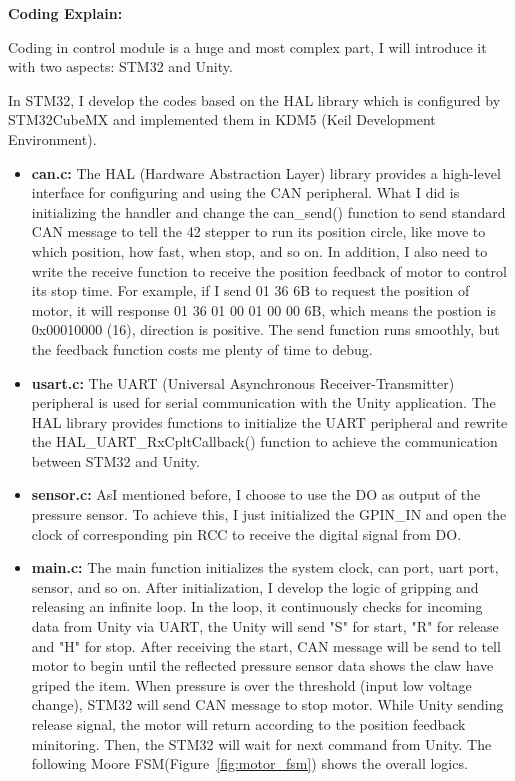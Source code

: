 \textbf{Coding Explain:}
  
Coding in control module is a huge and most complex part, I will introduce it with two aspects: STM32 and Unity.
  
In STM32, I develop the codes based on the HAL library which is configured by STM32CubeMX and implemented them in KDM5 (Keil Development Environment).
\begin{itemize}
    \item \textbf{can.c:} 
    The HAL (Hardware Abstraction Layer) library provides a high-level interface for configuring and using the CAN peripheral. What I did is initializing the handler and change the can\_send() function to send standard CAN message to tell the 42 stepper to run its position circle, like move to which position, how fast, when stop, and so on. In addition, I also need to write the receive function to receive the position feedback of motor to control its stop time. For example, if I send 01 36 6B to request the position of motor, it will response 01 36 01 00 01 00 00 6B, which means the postion is 0x00010000 (16), direction is positive. The send function runs smoothly, but the feedback function costs me plenty of time to debug.
    \item \textbf{usart.c:}
    The UART (Universal Asynchronous Receiver-Transmitter) peripheral is used for serial communication with the Unity application. The HAL library provides functions to initialize the UART peripheral and rewrite the HAL\_UART\_RxCpltCallback() function to achieve the communication between STM32 and Unity.
    \item \textbf{sensor.c:} 
    AsI mentioned before, I choose to use the DO as output of the pressure sensor. To achieve this, I just initialized the GPIN\_IN and open the clock of corresponding pin RCC to receive the digital signal from DO.
    \item \textbf{main.c:}
    The main function initializes the system clock, can port, uart port, sensor, and so on. After initialization, I develop the logic of gripping and releasing an infinite loop. In the loop, it continuously checks for incoming data from Unity via UART, the Unity will send "S" for start, "R" for release and "H" for stop. After receiving the start, CAN message will be send to tell motor to begin until the reflected pressure sensor data shows the claw have griped the item. When pressure is over the threshold (input low voltage change), STM32 will send CAN message to stop motor. While Unity sending release signal, the motor will return according to the position feedback minitoring. Then, the STM32 will wait for next command from Unity. The following Moore FSM(Figure~\ref{fig:motor_fsm}) shows the overall logics.
\end{itemize}
